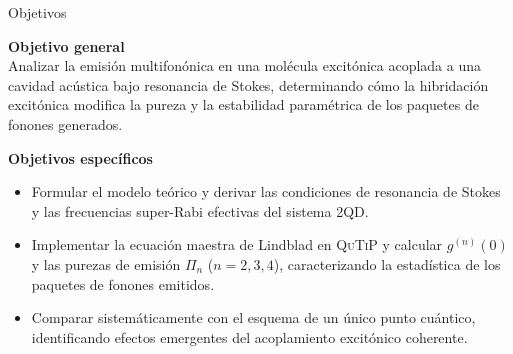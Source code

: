 \documentclass[
11pt,notheorems,hyperref={pdfauthor=whatever}
]{beamer}
\begin{document}
\begin{frame}{Objetivos}
	
	\textbf{Objetivo general}\\[4pt]
	Analizar la emisión multifonónica en una molécula excitónica acoplada a una cavidad acústica bajo resonancia de Stokes, determinando cómo la hibridación excitónica modifica la pureza y la estabilidad paramétrica de los paquetes de fonones generados.
	
	\vspace{8pt}
	\textbf{Objetivos específicos}
	\begin{itemize}
		\item Formular el modelo teórico y derivar las condiciones de resonancia de Stokes y las frecuencias super-Rabi efectivas del sistema 2QD.
		\item Implementar la ecuación maestra de Lindblad en \textsc{QuTiP} y calcular $g^{(n)}(0)$ y las purezas de emisión $\Pi_n$ ($n=2,3,4$), caracterizando la estadística de los paquetes de fonones emitidos.
		\item Comparar sistemáticamente con el esquema de un único punto cuántico, identificando efectos emergentes del acoplamiento excitónico coherente.
	\end{itemize}
	
\end{frame}
\end{document}
